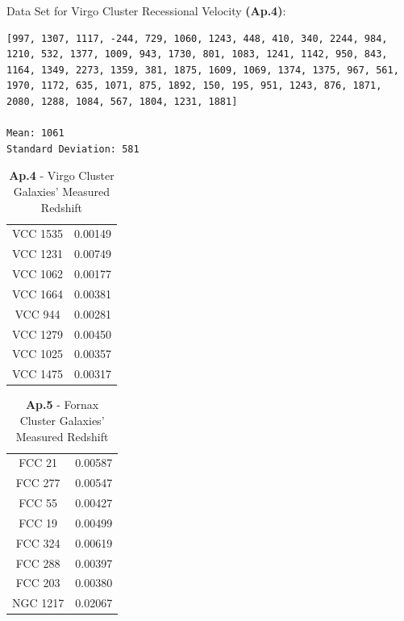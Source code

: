 \documentclass[12pt]{article}
\makeatletter
\newcommand{\boxspacing}{\kern\kvtcb@left@rule\kern\kvtcb@boxsep}
\newcommand{\prompt}[4]{
        {\ttfamily\llap{{\color{#2}[#3]:\hspace{3pt}#4}}\vspace{-\baselineskip}}
    }
\makeatother
\begin{document}
Data Set for Virgo Cluster Recessional Velocity \textbf{(Ap.4)}:
\begin{tcolorbox}[breakable, size=fbox, boxrule=1pt, pad at break*=1mm,colback=cellbackground, colframe=cellborder]
\prompt{In}{incolor}{34}{\boxspacing}
\begin{Verbatim}[commandchars=\\\{\}]
[997, 1307, 1117, -244, 729, 1060, 1243, 448, 410, 340, 2244, 984, 1210, 532, 1377, 1009, 943, 1730, 801, 1083, 1241, 1142, 950, 843, 1164, 1349, 2273, 1359, 381, 1875, 1609, 1069, 1374, 1375, 967, 561, 1970, 1172, 635, 1071, 875, 1892, 150, 195, 951, 1243, 876, 1871, 2080, 1288, 1084, 567, 1804, 1231, 1881]

Mean: 1061
Standard Deviation: 581 
    \end{Verbatim}
\end{tcolorbox}

















\begin{table}[h!]
    \centering
    \begin{tabular}{c|c}
        VCC 1535 &  0.00149 \\
        VCC 1231 & 0.00749\\
      VCC 1062  &  0.00177 \\
      VCC 1664  &  0.00381 \\
      VCC 944 & 0.00281 \\
       VCC 1279 &  0.00450 \\
       VCC 1025 &  0.00357 \\
       VCC 1475 & 0.00317
    \end{tabular}
    \caption{\textbf{Ap.4} - Virgo Cluster Galaxies' Measured Redshift}
    \label{tab:my_label}
\end{table}


\begin{table}[h!]
    \centering
    \begin{tabular}{c|c}
         FCC 21& 0.00587 \\
         FCC 277& 0.00547 \\
        FCC 55 & 0.00427 \\
        FCC 19 &  0.00499 \\
       FCC 324  &  0.00619 \\
       FCC 288 & 0.00397 \\
       FCC 203  &  0.00380 \\
       NGC 1217  & 0.02067
    \end{tabular}
    \caption{\textbf{Ap.5} - Fornax Cluster Galaxies' Measured Redshift}
    \label{tab:my_label}
\end{table}
\end{document}
